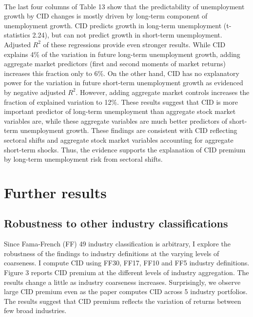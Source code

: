 \documentclass[12pt]{article}
\begin{document}
\paragraph{}
The last four columns of Table 13 show that the predictability of unemployment growth by CID changes is mostly driven by long-term component of unemployment growth. CID predicts growth in long-term unemployment (t-statistics 2.24), but can not predict growth in short-term unemployment. Adjusted $R^2$ of these regressions provide even stronger results. While CID explains 4\% of the variation in future long-term unemployment growth, adding aggregate market predictors (first and second moments of market returns) increases this fraction only to 6\%. On the other hand, CID has no explanatory power for the variation in future short-term unemployment growth as evidenced by negative adjusted $R^2$. However, adding aggregate market controls increases the fraction of explained variation to 12\%. These results suggest that CID is more important predictor of long-term unemployment than aggregate stock market variables are, while these aggregate variables are much better predictors of short-term unemployment growth. These findings are consistent with CID reflecting sectoral shifts and aggregate stock market variables accounting for aggregate short-term shocks. Thus, the evidence supports the explanation of CID premium by long-term unemployment risk from sectoral shifts.


\section{Further results} \label{sec:Model}
\subsection{Robustness to other industry classifications}

Since Fama-French (FF) 49 industry classification is arbitrary, I explore the robustness of the findings to industry definitions at the varying levels of coarseness. I compute CID using FF30, FF17, FF10 and FF5 industry definitions. Figure 3 reports CID premium at the different levels of industry aggregation. The results change a little as industry coarseness increases. Surprisingly, we observe large CID premium even as the paper computes CID across 5 industry portfolios. The results suggest that CID premium reflects the variation of returns between few broad industries. 
\end{document}
